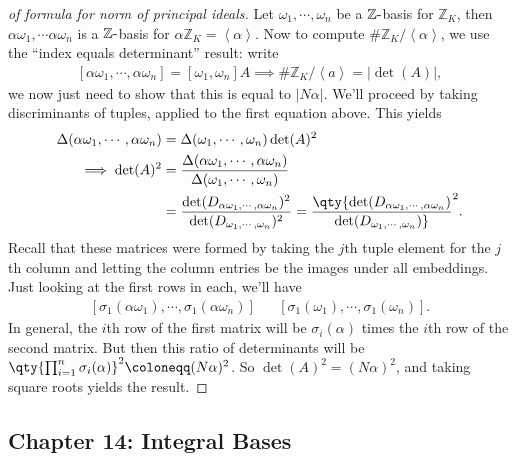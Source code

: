 \begin{proof}[of formula for norm of principal ideals]

Let \(\omega_1, \cdots, \omega_n\) be a \({\mathbb{Z}}{\hbox{-}}\)basis
for \({\mathbb{Z}}_K\), then \(\alpha \omega_1, \cdots \alpha \omega_n\)
is a \({\mathbb{Z}}{\hbox{-}}\)basis for
\(\alpha{\mathbb{Z}}_K = \left\langle{ \alpha }\right\rangle\). Now to
compute \(\# {\mathbb{Z}}_K/ \left\langle{ \alpha }\right\rangle\), we
use the ``index equals determinant'' result: write
\begin{align*}
{\left[ { \alpha \omega_1, \cdots, \alpha \omega_n} \right]} = {\left[ { \omega_1, \omega_n} \right]} A \implies \# {\mathbb{Z}}_K / \left\langle{ a }\right\rangle = {\left\lvert { \det(A) } \right\rvert} 
,\end{align*}
we now just need to show that this is equal to
\({\left\lvert { N \alpha } \right\rvert}\). We'll proceed by taking
discriminants of tuples, applied to the first equation above. This
yields
\begin{align*}
{\Delta}( \alpha \omega_1, \cdots, \alpha \omega_n) 
&= 
{\Delta}( \omega_1, \cdots, \omega_n) 
\det(A)^2 \\
\implies \det(A)^2 
&= 
{
{\Delta}( \alpha \omega_1, \cdots, \alpha \omega_n) 
\over
{\Delta}( \omega_1, \cdots, \omega_n) 
} \\
&=
{
\det(D_{\alpha \omega_1, \cdots, \alpha \omega_n })^2
\over
\det( D_{\omega_1, \cdots, \omega_n} )^2
}
=
\qty{
\det(D_{\alpha \omega_1, \cdots, \alpha \omega_n })
\over
\det( D_{\omega_1, \cdots, \omega_n} )
}^2
.\end{align*}
Recall that these matrices were formed by taking the \(j\)th tuple
element for the \(j\)th column and letting the column entries be the
images under all embeddings. Just looking at the first rows in each,
we'll have
\begin{align*}
{\left[ { \sigma_1( \alpha \omega_1), \cdots, \sigma_1( \alpha \omega_n) } \right]} && 
{\left[ { \sigma_1( \omega_1), \cdots, \sigma_1( \omega_n) } \right]} 
.\end{align*}
In general, the \(i\)th row of the first matrix will be
\(\sigma_i( \alpha)\) times the \(i\)th row of the second matrix. But
then this ratio of determinants will be
\(\qty{ \prod_{i=1}^n \sigma_i( \alpha )}^2 \coloneqq(N \alpha)^2\). So
\(\det(A)^2 = (N \alpha)^2\), and taking square roots yields the result.

\end{proof}

\hypertarget{chapter-14-integral-bases}{%
\subsection{Chapter 14: Integral
Bases}\label{chapter-14-integral-bases}}

